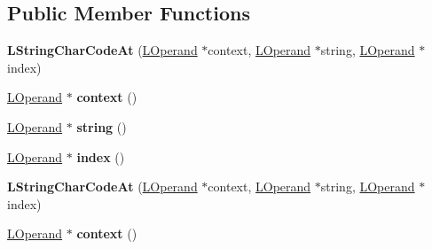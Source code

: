 \subsection*{Public Member Functions}
\begin{DoxyCompactItemize}
\item 
{\bfseries L\+String\+Char\+Code\+At} (\hyperlink{classv8_1_1internal_1_1_l_operand}{L\+Operand} $\ast$context, \hyperlink{classv8_1_1internal_1_1_l_operand}{L\+Operand} $\ast$string, \hyperlink{classv8_1_1internal_1_1_l_operand}{L\+Operand} $\ast$index)\hypertarget{classv8_1_1internal_1_1_l_string_char_code_at_a2ea27a024b27a329ff76364ab55c7cd1}{}\label{classv8_1_1internal_1_1_l_string_char_code_at_a2ea27a024b27a329ff76364ab55c7cd1}

\item 
\hyperlink{classv8_1_1internal_1_1_l_operand}{L\+Operand} $\ast$ {\bfseries context} ()\hypertarget{classv8_1_1internal_1_1_l_string_char_code_at_a9482271a8172ce48522512f232ac24aa}{}\label{classv8_1_1internal_1_1_l_string_char_code_at_a9482271a8172ce48522512f232ac24aa}

\item 
\hyperlink{classv8_1_1internal_1_1_l_operand}{L\+Operand} $\ast$ {\bfseries string} ()\hypertarget{classv8_1_1internal_1_1_l_string_char_code_at_a935ea67cb0997a56225d8943bd28acfc}{}\label{classv8_1_1internal_1_1_l_string_char_code_at_a935ea67cb0997a56225d8943bd28acfc}

\item 
\hyperlink{classv8_1_1internal_1_1_l_operand}{L\+Operand} $\ast$ {\bfseries index} ()\hypertarget{classv8_1_1internal_1_1_l_string_char_code_at_a6d34721abedba9af5cdca55a18b388c2}{}\label{classv8_1_1internal_1_1_l_string_char_code_at_a6d34721abedba9af5cdca55a18b388c2}

\item 
{\bfseries L\+String\+Char\+Code\+At} (\hyperlink{classv8_1_1internal_1_1_l_operand}{L\+Operand} $\ast$context, \hyperlink{classv8_1_1internal_1_1_l_operand}{L\+Operand} $\ast$string, \hyperlink{classv8_1_1internal_1_1_l_operand}{L\+Operand} $\ast$index)\hypertarget{classv8_1_1internal_1_1_l_string_char_code_at_a2ea27a024b27a329ff76364ab55c7cd1}{}\label{classv8_1_1internal_1_1_l_string_char_code_at_a2ea27a024b27a329ff76364ab55c7cd1}

\item 
\hyperlink{classv8_1_1internal_1_1_l_operand}{L\+Operand} $\ast$ {\bfseries context} ()\hypertarget{classv8_1_1internal_1_1_l_string_char_code_at_a9482271a8172ce48522512f232ac24aa}{}\label{classv8_1_1internal_1_1_l_string_char_code_at_a9482271a8172ce48522512f232ac24aa}


\end{DoxyCompactItemize}
